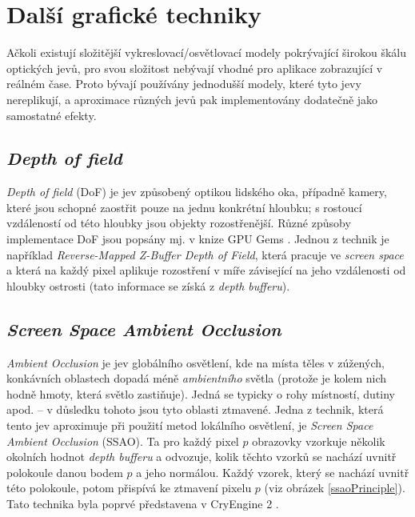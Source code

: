 \section{Další grafické techniky}
Ačkoli existují složitější vykreslovací/osvětlovací modely pokrývající širokou škálu optických jevů, pro svou složitost nebývají vhodné pro aplikace zobrazující v reálném čase. Proto bývají používány jednodušší modely, které tyto jevy nereplikují, a aproximace různých jevů pak implementovány dodatečně jako samostatné efekty.

\subsection{\textit{Depth of field}} \label{dof}
\textit{Depth of field} (DoF) je jev způsobený optikou lidského oka, případně kamery, které jsou schopné zaostřit pouze na jednu konkrétní hloubku; s rostoucí vzdáleností od této hloubky jsou objekty rozostřenější. Různé způsoby implementace DoF jsou popsány mj. v knize GPU Gems \cite{FernandoR2004Gg}. Jednou z technik je například \textit{Reverse-Mapped Z-Buffer Depth of Field}, která pracuje ve \textit{screen space} a která na každý pixel aplikuje rozostření v míře závisející na jeho vzdálenosti od hloubky ostrosti (tato informace se získá z \textit{depth bufferu}).

\subsection{\textit{Screen Space Ambient Occlusion}}
\textit{Ambient Occlusion} je jev globálního osvětlení, kde na místa těles v zúžených, konkávních oblastech dopadá méně \textit{ambientního} světla (protože je kolem nich hodně hmoty, která světlo zastiňuje). Jedná se typicky o rohy místností, dutiny apod. -- v důsledku tohoto jsou tyto oblasti ztmavené. Jedna z technik, která tento jev aproximuje při použití metod lokálního osvětlení, je \textit{Screen Space Ambient Occlusion} (SSAO). Ta pro každý pixel $p$ obrazovky vzorkuje několik okolních hodnot \textit{depth bufferu} a odvozuje, kolik těchto vzorků se nachází uvnitř polokoule danou bodem $p$ a jeho normálou. Každý vzorek, který se nachází uvnitř této polokoule, potom přispívá ke ztmavení pixelu $p$ (viz obrázek \ref{ssaoPrinciple}). Tato technika byla poprvé představena v CryEngine 2 \cite{Mittring:2007:FNG:1281500.1281671}.

